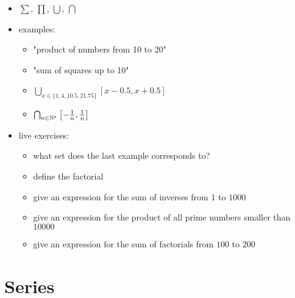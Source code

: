 \begin{itemize}
\tightlist
\item
  \(\sum\), \(\prod\), \(\bigcup\), \(\bigcap\)
\item
  examples:

  \begin{itemize}
  \tightlist
  \item
    "product of numbers from 10 to 20"
  \item
    "sum of squares up to 10"
  \item
    \(\bigcup_{x \in \{1,4,10.5, 21.75\}} \left[ x-0.5, x+0.5 \right]\)
  \item
    \(\bigcap_{n \in \mathbb{N}^*} \left[ -\frac{1}{n}, \frac{1}{n} \right]\)
  \end{itemize}
\item
  live exercises:

  \begin{itemize}
  \tightlist
  \item
    what set does the last example corresponds to?
  \item
    define the factorial
  \item
    give an expression for the sum of inverses from \(1\) to \(1000\)
  \item
    give an expression for the product of all prime numbers smaller than
    \(10000\)
  \item
    give an expression for the sum of factorials from \(100\) to \(200\)
  \end{itemize}
\end{itemize}

\hypertarget{series}{%
\section{Series}\label{series}}

